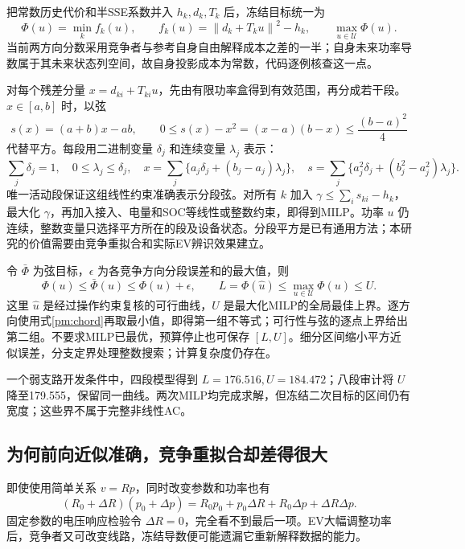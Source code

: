 \documentclass[UTF8,fontset=fandol,11pt,a4paper]{ctexart}
\newcommand{\norm}[1]{\left\lVert#1\right\rVert}
\begin{document}
把常数历史代价和半SSE系数并入 $h_k,d_k,T_k$ 后，冻结目标统一为
\begin{equation}
 \Phi(u)=\min_k f_k(u),\qquad f_k(u)=\norm{d_k+T_ku}^2-h_k,
 \qquad\max_{u\in\mathcal U}\Phi(u).
 \label{pm:objective}
\end{equation}
当前两方向分数采用竞争者与参考自身自由解释成本之差的一半；自身未来功率导数属于其未来状态列空间，故自身投影成本为常数，代码逐例核查这一点。

对每个残差分量 $x=d_{ki}+T_{ki}u$，先由有限功率盒得到有效范围，再分成若干段。$x\in[a,b]$ 时，以弦
\begin{equation}
 s(x)=(a+b)x-ab,\qquad
 0\le s(x)-x^2=(x-a)(b-x)\le\frac{(b-a)^2}{4}
 \label{pm:chord}
\end{equation}
代替平方。每段用二进制变量 $\delta_j$ 和连续变量 $\lambda_j$ 表示：
\[
 \sum_j\delta_j=1,\quad0\le\lambda_j\le\delta_j,\quad
 x=\sum_j\{a_j\delta_j+(b_j-a_j)\lambda_j\},\quad
 s=\sum_j\{a_j^2\delta_j+(b_j^2-a_j^2)\lambda_j\}.
\]
唯一活动段保证这组线性约束准确表示分段弦。对所有 $k$ 加入
$\gamma\le\sum_i s_{ki}-h_k$，最大化 $\gamma$，再加入接入、电量和SOC等线性或整数约束，即得到MILP。功率 $u$ 仍连续，整数变量只选择平方所在的段及设备状态。分段平方是已有通用方法\cite{barmann-pwl}；本研究的价值需要由竞争重拟合和实际EV辨识效果建立。

令 $\bar\Phi$ 为弦目标，$\epsilon$ 为各竞争方向分段误差和的最大值，则
\begin{equation}
 \Phi(u)\le\bar\Phi(u)\le\Phi(u)+\epsilon,\qquad
 L=\Phi(\hat u)\le\max_{u\in\mathcal U}\Phi(u)\le U.
 \label{pm:bounds}
\end{equation}
这里 $\hat u$ 是经过操作约束复核的可行曲线，$U$ 是最大化MILP的全局最佳上界。逐方向使用式\eqref{pm:chord}再取最小值，即得第一组不等式；可行性与弦的逐点上界给出第二组。不要求MILP已最优，预算停止也可保存 $[L,U]$。细分区间缩小平方近似误差，分支定界处理整数搜索；计算复杂度仍存在。

一个弱支路开发条件中，四段模型得到 $L=176.516,U=184.472$；八段审计将 $U$ 降至179.555，保留同一曲线。两次MILP均完成求解，但冻结二次目标的区间仍有宽度；这些界不属于完整非线性AC。

\subsection{为何前向近似准确，竞争重拟合却差得很大}
即使使用简单关系 $v=Rp$，同时改变参数和功率也有
\[
 (R_0+\Delta R)(p_0+\Delta p)
 =R_0p_0+p_0\Delta R+R_0\Delta p+\Delta R\Delta p.
\]
固定参数的电压响应检验令 $\Delta R=0$，完全看不到最后一项。EV大幅调整功率后，竞争者又可改变线路，冻结导数便可能遗漏它重新解释数据的能力。
\end{document}
